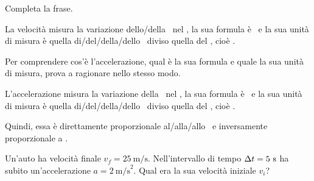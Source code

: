 \documentclass[11pt]{report}
\begin{document}
\begin{exercise}[\onestar]
Completa la frase.

\smallskip
\noindent La velocità misura la variazione dello/della \blank[3cm]\ nel \blank[3cm], la sua formula è \blank[3cm]\ e la sua unità di misura è quella di/del/\newline della/dello \blank[3cm]\ diviso quella del \blank[3cm], cioè \blank[2.5cm].
\end{exercise}

\begin{exercise}[\onestar]
Per comprendere cos'è l'accelerazione, qual è la sua formula e quale la sua unità di misura, prova a ragionare nello stesso modo.

\smallskip
\noindent L'accelerazione misura la variazione della \blank[3cm]\ nel \blank[3cm], la sua formula è \blank[3cm]\ e la sua unità di misura è quella di/del/\newline della/dello \blank[3cm]\ diviso quella del \blank[3cm], cioè \blank[2.5cm].

\smallskip
\noindent Quindi, essa è direttamente proporzionale al/alla/allo \blank[6cm]\ e inversamente proporzionale a \blank[3cm].
\end{exercise}

\begin{exercise}[\onestar]
Un'auto ha velocità finale $v_f=25\ \text{m/s}$. Nell'intervallo di tempo $\Delta t = 5\ \text s$ ha subito un'accelerazione $a=2\ \text{m/s}^2$. Qual era la sua velocità iniziale $v_i$?
\end{exercise}





\end{document}
